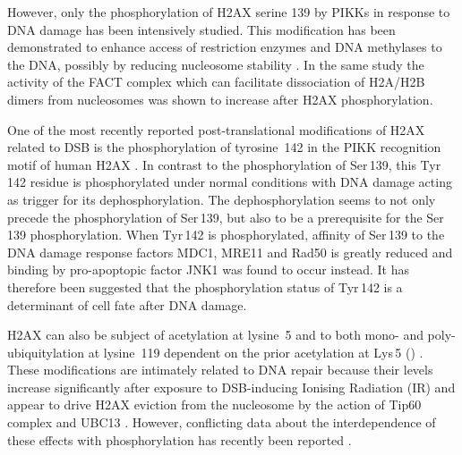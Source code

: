 However, only the phosphorylation of H2AX serine 139 by PIKKs in response to DNA damage has been
intensively studied. This modification has been demonstrated to enhance access of restriction
enzymes and DNA methylases to the DNA, possibly by reducing nucleosome stability \citep{KHHK+08}. In
the same study the activity of the FACT complex which can facilitate dissociation of H2A/H2B dimers
from nucleosomes was shown to increase after H2AX phosphorylation.

One of the most recently reported post-translational modifications of H2AX related to DSB is the
phosphorylation of tyrosine~142 in the PIKK recognition motif of human H2AX \citep{XLS+09,CJT+09}. In
contrast to the phosphorylation of Ser\,139, this Tyr\,142 residue is phosphorylated under normal
conditions with DNA damage acting as trigger for its dephosphorylation. The dephosphorylation seems
to not only precede the phosphorylation of Ser\,139, but also to be a prerequisite for the Ser\,139
phosphorylation. When Tyr\,142 is phosphorylated, affinity of Ser\,139 to the DNA damage response
factors MDC1, MRE11 and Rad50 is greatly reduced and binding by pro-apoptopic factor JNK1 was found
to occur instead. It has therefore been suggested that the phosphorylation status of Tyr\,142 is a
determinant of cell fate after DNA damage.

H2AX can also be subject of acetylation at lysine~5 \citep{PB81} and to both mono- and poly-ubiquitylation
at lysine~119 dependent on the prior acetylation at Lys\,5 () \citep{ITK+07}. These
modifications are intimately related to DNA repair because their levels increase significantly after
exposure to DSB-inducing Ionising Radiation (IR) and appear to drive H2AX eviction from the nucleosome
by the action of Tip60 complex and UBC13 \citep{ITK+07}. However, conflicting data about the
interdependence of these effects with phosphorylation has recently been reported \citep{RVD+09}.

